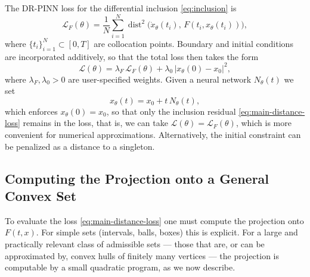 \documentclass[11pt]{elsarticle}
\theoremstyle{definition}
\theoremstyle{remark}
\numberwithin{equation}{section}
\def\dist{\operatorname{dist}}
\begin{document}
	The DR-PINN loss for the differential inclusion \eqref{eq:inclusion} is
	\begin{equation}\label{eq:main-distance-loss}
		\mathcal{L}_F(\theta)
		=
		\frac{1}{N}\sum_{i=1}^{N}
		\dist^2\bigl(\dot{x}_\theta(t_i),\,F(t_i,x_\theta(t_i))\bigr),
	\end{equation}
	where $\{t_i\}_{i=1}^N\subset[0,T]$ are collocation points.  Boundary
	and initial conditions are incorporated additively, so that
	the total loss then takes the form
	\[
	\mathcal{L}(\theta)
	=
	\lambda_F\,\mathcal{L}_F(\theta)
	+
	\lambda_0\,|x_\theta(0)-x_0|^2,
	\]
	where $\lambda_F,\lambda_0>0$ are user-specified weights.
	Given a neural network $N_\theta(t)$ we set
	\[
	x_\theta(t)=x_0+t\,N_\theta(t),
	\]
	which enforces $x_\theta(0)=x_0$, so that only the inclusion residual
	\eqref{eq:main-distance-loss} remains in the loss, that is, we can take
	$\mathcal{L}(\theta) = \mathcal{L}_F(\theta)$,
	which is more convenient for numerical approximations.
	Alternatively, the
	initial constraint can be penalized as a distance to a singleton.
	
	
	
	\subsection{Computing the Projection onto a General Convex Set}
	\label{sec:projection-extreme-points}
	
	To evaluate the loss \eqref{eq:main-distance-loss} one must compute
	the projection onto $F(t,x)$.  For simple sets
	(intervals, balls, boxes) this is explicit.  For a large and practically
	relevant class of admissible sets --- those that are, or can be
	approximated by, convex hulls of finitely many vertices --- the
	projection is computable by a small quadratic program, as we now
	describe.
	
\end{document}
